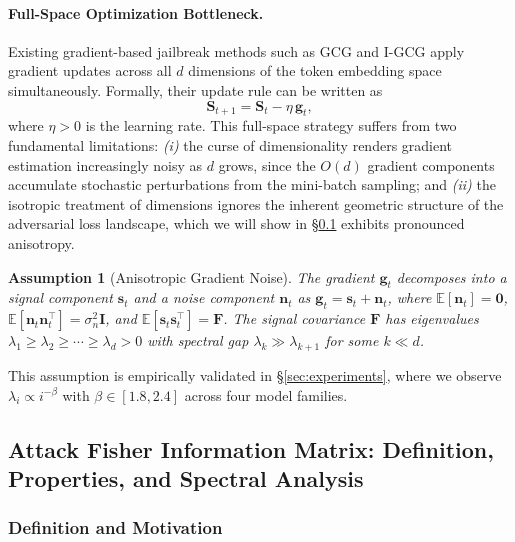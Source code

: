 ﻿\documentclass[lettersize,journal]{IEEEtran}
\newtheorem{assumption}{Assumption}
\begin{document}
\paragraph{Full-Space Optimization Bottleneck.} Existing gradient-based jailbreak methods such as GCG \cite{zou2023universal} and I-GCG \cite{jia2024improved} apply gradient updates across all $d$ dimensions of the token embedding space simultaneously. Formally, their update rule can be written as
\begin{equation}
\label{eq:full_space_update}
\mathbf{S}_{t+1} = \mathbf{S}_t - \eta \, \mathbf{g}_t,
\end{equation}
where $\eta > 0$ is the learning rate. This full-space strategy suffers from two fundamental limitations: \textit{(i)} the curse of dimensionality renders gradient estimation increasingly noisy as $d$ grows, since the $O(d)$ gradient components accumulate stochastic perturbations from the mini-batch sampling; and \textit{(ii)} the isotropic treatment of dimensions ignores the inherent geometric structure of the adversarial loss landscape, which we will show in \S\ref{sec:afim} exhibits pronounced anisotropy.

\begin{assumption}[Anisotropic Gradient Noise]
\label{ass:anisotropic_noise}
The gradient $\mathbf{g}_t$ decomposes into a signal component $\mathbf{s}_t$ and a noise component $\mathbf{n}_t$ as $\mathbf{g}_t = \mathbf{s}_t + \mathbf{n}_t$, where $\mathbb{E}[\mathbf{n}_t] = \mathbf{0}$, $\mathbb{E}[\mathbf{n}_t \mathbf{n}_t^\top] = \sigma_n^2 \mathbf{I}$, and $\mathbb{E}[\mathbf{s}_t \mathbf{s}_t^\top] = \mathbf{F}$. The signal covariance $\mathbf{F}$ has eigenvalues $\lambda_1 \geq \lambda_2 \geq \cdots \geq \lambda_d > 0$ with spectral gap $\lambda_k \gg \lambda_{k+1}$ for some $k \ll d$.
\end{assumption}

This assumption is empirically validated in \S\ref{sec:experiments}, where we observe $\lambda_i \propto i^{-\beta}$ with $\beta \in [1.8, 2.4]$ across four model families.

\subsection{Attack Fisher Information Matrix: Definition, Properties, and Spectral Analysis}
\label{sec:afim}

\subsubsection{Definition and Motivation}
\end{document}

